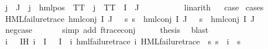 \begin{isabellebody}
{\isasymand}\ {\isacharparenleft}{\kern0pt}{\isasymforall}j{\isasymin}{\isasymPhi}\ {\isacharbackquote}{\kern0pt}\ J{\isachardot}{\kern0pt}\ {\isasymexists}{\isasymalpha}{\isachardot}{\kern0pt}\ j\ {\isacharequal}{\kern0pt}\ hml{\isacharunderscore}{\kern0pt}pos\ {\isasymalpha}\ TT\ {\isasymor}\ j\ {\isacharequal}{\kern0pt}\ TT{\isacharparenright}{\kern0pt}\ {\isasymand}\ I\ {\isasyminter}\ J\ {\isasymnoteq}\ {\isacharbraceleft}{\kern0pt}{\isacharbraceright}{\kern0pt}{\isachardoublequoteclose}\isanewline
\ \ \ \ \isamarkupfalse%
\ {}\ \isamarkupfalse%
\ linarith\isanewline
{}\isamarkupfalse%
\ \isamarkupfalse%
\ {\isacharquery}{\kern0pt}case\ \isamarkupfalse%
{\isacharparenleft}{\kern0pt}cases{\isacharparenright}{\kern0pt}\isanewline
\ \ \isamarkupfalse%
\ {}\isanewline
\ \ \isamarkupfalse%
\ {\isachardoublequoteopen}HML{\isacharunderscore}{\kern0pt}failure{\isacharunderscore}{\kern0pt}trace\ {\isacharparenleft}{\kern0pt}hml{\isacharunderscore}{\kern0pt}conj\ I\ J\ {\isasymPhi}{\isacharparenright}{\kern0pt}\ {\isasymand}\ {\isacharparenleft}{\kern0pt}{\isasymforall}s{\isachardot}{\kern0pt}\ {\isacharparenleft}{\kern0pt}s\ {\isasymTurnstile}\ hml{\isacharunderscore}{\kern0pt}conj\ I\ J\ {\isasymPhi}{\isacharparenright}{\kern0pt}\ {\isacharequal}{\kern0pt}\ {\isacharparenleft}{\kern0pt}s\ {\isasymTurnstile}\ {\isacharparenleft}{\kern0pt}hml{\isacharunderscore}{\kern0pt}conj\ I\ J\ {\isasymPhi}{\isacharparenright}{\kern0pt}{\isacharparenright}{\kern0pt}{\isacharparenright}{\kern0pt}{\isachardoublequoteclose}\isanewline
\ \ \ \ \isamarkupfalse%
\ neg{\isacharunderscore}{\kern0pt}case\ \isanewline
\ \ \ \ \isamarkupfalse%
\ {\isacharparenleft}{\kern0pt}simp\ add{\isacharcolon}{\kern0pt}\ f{\isacharunderscore}{\kern0pt}trace{\isacharunderscore}{\kern0pt}conj{\isacharparenright}{\kern0pt}\isanewline
\ \ \isamarkupfalse%
\ \isamarkupfalse%
\ {\isacharquery}{\kern0pt}thesis\ \isamarkupfalse%
\ blast\isanewline
{}\isamarkupfalse%
\isanewline
\ \ \isamarkupfalse%
\ {}\isanewline
\ \ \isamarkupfalse%
\ \isamarkupfalse%
\ i\ {\isasympsi}\ \ IH{\isacharcolon}{\kern0pt}\ {\isachardoublequoteopen}i{\isasymin}{\isasymPhi}\ {\isacharbackquote}{\kern0pt}\ I{\isachardoublequoteclose}\ {\isachardoublequoteopen}{\isasymPhi}\ {\isacharbackquote}{\kern0pt}\ I\ {\isacharequal}{\kern0pt}\ {\isacharbraceleft}{\kern0pt}i{\isacharbraceright}{\kern0pt}{\isachardoublequoteclose}\ {\isachardoublequoteopen}hml{\isacharunderscore}{\kern0pt}failure{\isacharunderscore}{\kern0pt}trace\ i{\isachardoublequoteclose}\ {\isachardoublequoteopen}HML{\isacharunderscore}{\kern0pt}failure{\isacharunderscore}{\kern0pt}trace\ {\isasympsi}{\isachardoublequoteclose}\ {\isachardoublequoteopen}{\isacharparenleft}{\kern0pt}{\isasymforall}s{\isachardot}{\kern0pt}\ {\isacharparenleft}{\kern0pt}s\ {\isasymTurnstile}\ i{\isacharparenright}{\kern0pt}\ {\isacharequal}{\kern0pt}\ {\isacharparenleft}{\kern0pt}s\ {\isasymTurnstile}\ {\isasympsi}{\isacharparenright}{\kern0pt}{\isacharparenright}{\kern0pt}{\isachardoublequoteclose}\isanewline

\end{isabellebody}
